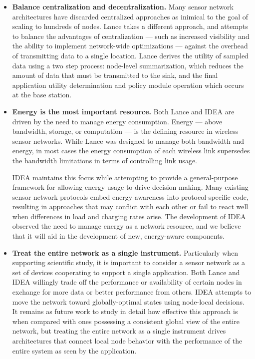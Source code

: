 \begin{itemize}

\item \textbf{Balance centralization and decentralization.} Many sensor
network architectures have discarded centralized approaches as inimical to
the goal of scaling to hundreds of nodes. Lance takes a different approach,
and attempts to balance the advantages of centralization --- such as
increased visibility and the ability to implement network-wide optimizations
--- against the overhead of transmitting data to a single location. Lance
derives the utility of sampled data using a two step process: node-level
summarization, which reduces the amount of data that must be transmitted to
the sink, and the final application utility determination and policy module
operation which occurs at the base station.

\item \textbf{Energy is the most important resource.} Both Lance and IDEA
are driven by the need to manage energy consumption. Energy --- above
bandwidth, storage, or computation --- is the defining resource in wireless
sensor networks. While Lance was designed to manage both bandwidth and
energy, in most cases the energy consumption of each wireless link supersedes
the bandwidth limitations in terms of controlling link usage.

IDEA maintains this focus while attempting to provide a general-purpose
framework for allowing energy usage to drive decision making. Many existing
sensor network protocols embed energy awareness into protocol-specific code,
resulting in approaches that may conflict with each other or fail to react
well when differences in load and charging rates arise. The development of
IDEA observed the need to manage energy as a network resource, and we believe
that it will aid in the development of new, energy-aware components.

\item \textbf{Treat the entire network as a single instrument.} Particularly
when supporting scientific study, it is important to consider a sensor
network as a set of devices cooperating to support a single application. Both
Lance and IDEA willingly trade off the performance or availability of certain
nodes in exchange for more data or better performance from others. IDEA
attempts to move the network toward globally-optimal states using node-local
decisions. It remains as future work to study in detail how effective this
approach is when compared with ones possessing a consistent global view of
the entire network, but treating the entire network as a single instrument
drives architectures that connect local node behavior with the performance of
the entire system as seen by the application.

\end{itemize}

